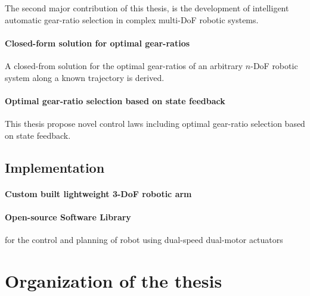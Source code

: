 The second major contribution of this thesis, is the development of intelligent automatic gear-ratio selection in complex multi-DoF robotic systems.

\paragraph{Closed-form solution for optimal gear-ratios}

A closed-from solution for the optimal gear-ratios of an arbitrary $n$-DoF robotic system along a known trajectory is derived.

\paragraph{Optimal gear-ratio selection based on state feedback}

This thesis propose novel control laws including optimal gear-ratio selection based on state feedback. 

\subsection{Implementation}

\paragraph{Custom built lightweight 3-DoF robotic arm}

\paragraph{Open-source Software Library}

for the control and planning of robot using dual-speed dual-motor actuators


\section{Organization of the thesis}
\label{sec:OrganisationOfTheThesis}




